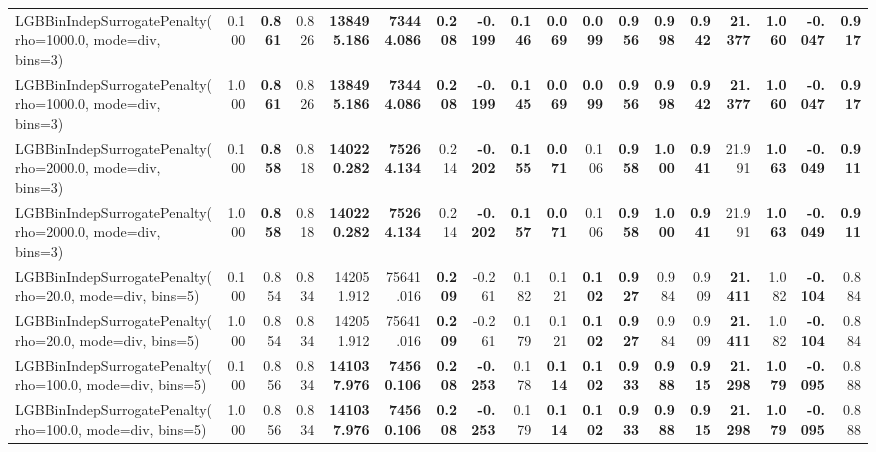 \documentclass[11pt]{article}
\theoremstyle{plain}
\theoremstyle{definition}
\newcommand{\1}{\mathbf{1}}
\begin{document}
\begin{table}[htbp]
{\begin{tabular}{lrrrrrrrrrrrrrrrrr}
LGBBinIndepSurrogatePenalty(rho=1000.0, mode=div, bins=3) & 0.100 & \textbf{0.861} & 0.826 & \textbf{138495.186} & \textbf{73444.086} & \textbf{0.208} & \textbf{-0.199} & \textbf{0.146} & \textbf{0.069} & \textbf{0.099} & \textbf{0.956} & \textbf{0.998} & \textbf{0.942} & \textbf{21.377} & \textbf{1.060} & \textbf{-0.047} & \textbf{0.917} \\
LGBBinIndepSurrogatePenalty(rho=1000.0, mode=div, bins=3) & 1.000 & \textbf{0.861} & 0.826 & \textbf{138495.186} & \textbf{73444.086} & \textbf{0.208} & \textbf{-0.199} & \textbf{0.145} & \textbf{0.069} & \textbf{0.099} & \textbf{0.956} & \textbf{0.998} & \textbf{0.942} & \textbf{21.377} & \textbf{1.060} & \textbf{-0.047} & \textbf{0.917} \\
LGBBinIndepSurrogatePenalty(rho=2000.0, mode=div, bins=3) & 0.100 & \textbf{0.858} & 0.818 & \textbf{140220.282} & \textbf{75264.134} & 0.214 & \textbf{-0.202} & \textbf{0.155} & \textbf{0.071} & 0.106 & \textbf{0.958} & \textbf{1.000} & \textbf{0.941} & 21.991 & \textbf{1.063} & \textbf{-0.049} & \textbf{0.911} \\
LGBBinIndepSurrogatePenalty(rho=2000.0, mode=div, bins=3) & 1.000 & \textbf{0.858} & 0.818 & \textbf{140220.282} & \textbf{75264.134} & 0.214 & \textbf{-0.202} & \textbf{0.157} & \textbf{0.071} & 0.106 & \textbf{0.958} & \textbf{1.000} & \textbf{0.941} & 21.991 & \textbf{1.063} & \textbf{-0.049} & \textbf{0.911} \\
LGBBinIndepSurrogatePenalty(rho=20.0, mode=div, bins=5) & 0.100 & 0.854 & 0.834 & 142051.912 & 75641.016 & \textbf{0.209} & -0.261 & 0.182 & 0.121 & \textbf{0.102} & \textbf{0.927} & 0.984 & 0.909 & \textbf{21.411} & 1.082 & \textbf{-0.104} & 0.884 \\
LGBBinIndepSurrogatePenalty(rho=20.0, mode=div, bins=5) & 1.000 & 0.854 & 0.834 & 142051.912 & 75641.016 & \textbf{0.209} & -0.261 & 0.179 & 0.121 & \textbf{0.102} & \textbf{0.927} & 0.984 & 0.909 & \textbf{21.411} & 1.082 & \textbf{-0.104} & 0.884 \\
LGBBinIndepSurrogatePenalty(rho=100.0, mode=div, bins=5) & 0.100 & 0.856 & 0.834 & \textbf{141037.976} & \textbf{74560.106} & \textbf{0.208} & \textbf{-0.253} & 0.178 & \textbf{0.114} & \textbf{0.102} & \textbf{0.933} & \textbf{0.988} & \textbf{0.915} & \textbf{21.298} & \textbf{1.079} & \textbf{-0.095} & 0.888 \\
LGBBinIndepSurrogatePenalty(rho=100.0, mode=div, bins=5) & 1.000 & 0.856 & 0.834 & \textbf{141037.976} & \textbf{74560.106} & \textbf{0.208} & \textbf{-0.253} & 0.179 & \textbf{0.114} & \textbf{0.102} & \textbf{0.933} & \textbf{0.988} & \textbf{0.915} & \textbf{21.298} & \textbf{1.079} & \textbf{-0.095} & 0.888 \\

\end{tabular}}
\end{table}
\end{document}
